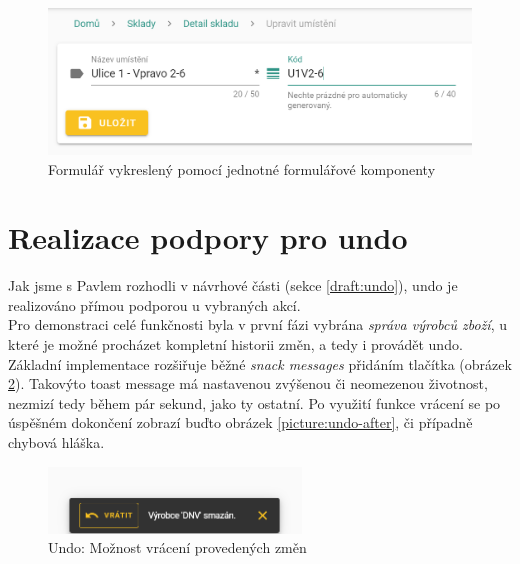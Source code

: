 \begin{figure}[]
\includegraphics[width=\textwidth]{../png/app/form_stock_location.png}
\caption{Formulář vykreslený pomocí jednotné formulářové komponenty} \label{picture:form-stock-location}
\end{figure}


\section{Realizace podpory pro undo}\label{implementation:undo}

Jak jsme s Pavlem rozhodli v návrhové části (sekce \ref{draft:undo}), undo je realizováno přímou podporou u vybraných akcí.\\
Pro demonstraci celé funkčnosti byla v první fázi vybrána \emph{správa výrobců zboží}, u které je možné procházet kompletní historii změn, a tedy i provádět undo. Základní implementace rozšiřuje běžné \emph{snack messages} přidáním tlačítka  (obrázek \ref{picture:undo}). Takovýto toast message má nastavenou zvýšenou či neomezenou životnost, nezmizí tedy během pár sekund, jako ty ostatní. Po využití funkce vrácení se po úspěšném dokončení zobrazí buďto obrázek \ref{picture:undo-after}, či případně chybová hláška.

\begin{figure}[]
\includegraphics[width=0.6\textwidth]{../png/app/undo_snack.png}
\caption{Undo: Možnost vrácení provedených změn} \label{picture:undo}
\end{figure}

